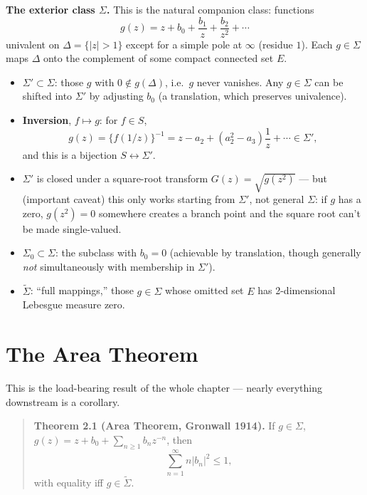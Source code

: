 \documentclass[
]{book}
\providecommand{\tightlist}{%
  \setlength{\itemsep}{0pt}\setlength{\parskip}{0pt}}
\theoremstyle{definition}
\theoremstyle{definition}
\theoremstyle{definition}
\theoremstyle{definition}
\theoremstyle{remark}
\begin{document}
\textbf{The exterior class \(\Sigma\).} This is the natural companion class: functions
\[g(z) = z + b_0 + \frac{b_1}{z} + \frac{b_2}{z^2}+\cdots\]
univalent on \(\Delta = \{|z|>1\}\) except for a simple pole at \(\infty\) (residue \(1\)). Each \(g\in\Sigma\) maps \(\Delta\) onto the complement of some compact connected set \(E\).

\begin{itemize}
\tightlist
\item
  \(\Sigma'\subset\Sigma\): those \(g\) with \(0 \notin g(\Delta)\), i.e.~\(g\) never vanishes. Any \(g\in\Sigma\) can be shifted into \(\Sigma'\) by adjusting \(b_0\) (a translation, which preserves univalence).
\item
  \textbf{Inversion}, \(f\mapsto g\): for \(f\in S\),
  \[g(z) = \{f(1/z)\}^{-1} = z - a_2 + (a_2^2-a_3)\frac1z + \cdots \in \Sigma',\]
  and this is a bijection \(S \leftrightarrow \Sigma'\).
\item
  \(\Sigma'\) is closed under a square-root transform \(G(z) = \sqrt{g(z^2)}\) --- but (important caveat) this only works starting from \(\Sigma'\), not general \(\Sigma\): if \(g\) has a zero, \(g(z^2)=0\) somewhere creates a branch point and the square root can't be made single-valued.
\item
  \(\Sigma_0 \subset \Sigma\): the subclass with \(b_0=0\) (achievable by translation, though generally \emph{not} simultaneously with membership in \(\Sigma'\)).
\item
  \(\tilde\Sigma\): ``full mappings,'' those \(g\in\Sigma\) whose omitted set \(E\) has 2-dimensional Lebesgue measure zero.
\end{itemize}

\section{The Area Theorem}\label{the-area-theorem}

This is the load-bearing result of the whole chapter --- nearly everything downstream is a corollary.

\begin{quote}
\textbf{Theorem 2.1 (Area Theorem, Gronwall 1914).} If \(g \in \Sigma\), \(g(z) = z+b_0+\sum_{n\ge1}b_nz^{-n}\), then
\[\sum_{n=1}^\infty n|b_n|^2 \le 1,\]
with equality iff \(g \in \tilde\Sigma\).
\end{quote}
\end{document}

